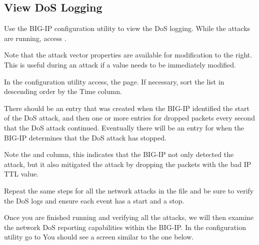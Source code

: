 \documentclass[letterpaper,10pt,english]{sphinxmanual}
\begin{document}
\subsection{View DoS Logging}
\label{\detokenize{class1/module3/lab3:view-dos-logging}}\label{\detokenize{class1/module3/lab3::doc}}
Use the BIG-IP configuration utility to view the DoS logging. While the
attacks are running, access .


Note that the attack vector properties are available for modification to
the right. This is useful during an attack if a value needs to be
immediately modified.

In the configuration utility access, the  page. If necessary, sort the list in descending
order by the Time column.


There should be an entry that was created when the BIG-IP identified the
start of the DoS attack, and then one or more entries for dropped
packets every second that the DoS attack continued. Eventually there
will be an entry for when the BIG-IP determines that the DoS attack has
stopped.


Note the  and  column, this indicates
that the BIG-IP not only detected the attack, but it also mitigated the
attack by dropping the packets with the bad IP TTL value.

Repeat the same steps for all the network attacks in the file and be
sure to verify the DoS logs and ensure each event has a start and a
stop.

Once you are finished running and verifying all the attacks, we will
then examine the network DoS reporting capabilities within the BIG-IP.
In the configuration utility go to  You should see a screen similar to the one below.

\end{document}
